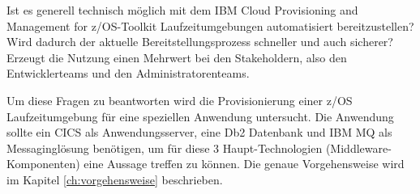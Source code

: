Ist es generell technisch möglich mit dem \glqq IBM Cloud Provisioning and Management for z/OS\grqq-Toolkit Laufzeitumgebungen automatisiert bereitzustellen?
Wird dadurch der aktuelle Bereitstellungsprozess schneller und auch sicherer?
Erzeugt die Nutzung einen Mehrwert bei den Stakeholdern, also den Entwicklerteams und den Administratorenteams.

Um diese Fragen zu beantworten wird die Provisionierung einer z/OS Laufzeitumgebung für eine speziellen Anwendung untersucht.
Die Anwendung sollte ein CICS als Anwendungsserver, eine Db2 Datenbank und IBM MQ als Messaginglösung benötigen, um für diese 3 Haupt-Technologien (Middleware-Komponenten) eine Aussage treffen zu können.
Die genaue Vorgehensweise wird im Kapitel \ref{ch:vorgehensweise} beschrieben.